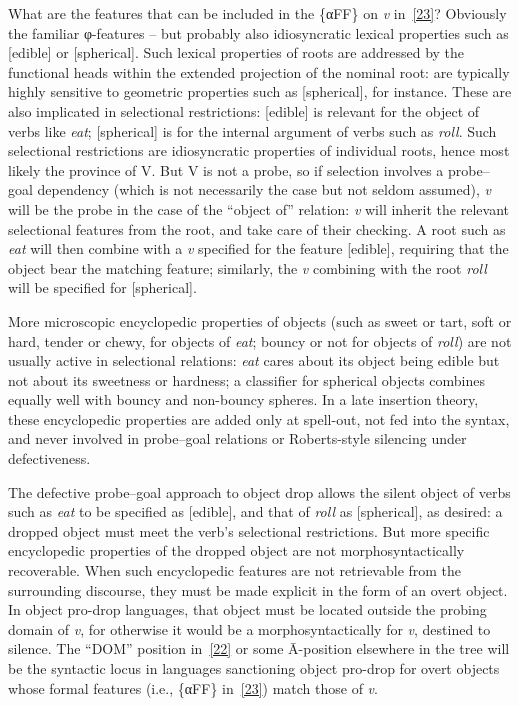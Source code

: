 \documentclass[output=paper]{langsci/langscibook}
\begin{document}
\begin{refcontext}
What are the features that can be included in the \{α{}FF\} on
\emph{v} in~\eqref{23}? Obviously the familiar φ{}-features -- but
probably also idiosyncratic lexical properties such as [edible] or [spherical].
Such lexical properties of roots are addressed by the functional heads within
the extended projection of the nominal root:  are typically highly
sensitive to geometric properties such as [spherical], for instance. These are
also implicated in selectional restrictions: [edible] is relevant for the
object of verbs like \emph{eat}; [spherical] is for the internal argument of
verbs such as \emph{roll}. Such selectional restrictions are idiosyncratic
properties of individual roots, hence most likely the province of V. But V is
not a probe, so if selection involves a probe--goal dependency (which is not
necessarily the case but not seldom assumed), \emph{v} will be the probe in the
case of the \enquote{object of} relation: \emph{v} will inherit the relevant
selectional features from the root, and take care of their checking. A root
such as \emph{eat} will then combine with a \emph{v} specified for the feature
[edible], requiring that the object bear the matching feature; similarly, the
\emph{v} combining with the root \emph{roll} will be specified for [spherical].

More microscopic encyclopedic properties of objects (such as sweet or tart,
soft or hard, tender or chewy, for objects of \emph{eat}; bouncy or not for
objects of \emph{roll}) are not usually active in selectional relations:
\emph{eat} cares about its object being edible but not about its sweetness or
hardness; a classifier for spherical objects combines equally well with bouncy
and non-bouncy spheres. In a late insertion theory, these encyclopedic
properties are added only at spell-out, not fed into the syntax, and never
involved in probe--goal relations or Roberts-style silencing under
defectiveness.

The defective probe--goal approach to object drop allows the silent object of
verbs such as \emph{eat} to be specified as [edible], and that of \emph{roll}
as [spherical], as desired: a dropped object must meet the verb's selectional
restrictions. But more specific encyclopedic properties of the dropped object
are not morphosyntactically recoverable. When such encyclopedic features are
not retrievable from the surrounding discourse, they must be made explicit in
the form of an overt object. In object pro-drop languages, that object must be
located outside the probing domain of \emph{v}, for otherwise it would be a
morphosyntactically  for \emph{v}, destined to silence. The
\enquote{DOM} position in~\eqref{22} or some \=A-position elsewhere in the tree will
be the syntactic locus in languages sanctioning object pro-drop for overt
objects whose formal features (i.e.,  \{α{}FF\} in~\eqref{23}) match
those of \emph{v}.


\end{refcontext}
\end{document}
